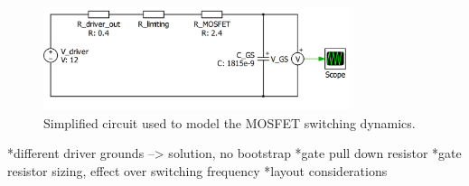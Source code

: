 \begin{figure}[htbp]
	\begin{center}
		\includegraphics[width=0.8\textwidth]{../Pictures/P1/Component_sizing/driver_resistor_sizing.png}
		\caption{Simplified circuit used to model the MOSFET switching dynamics.}
		\label{mosfet_rc_gate}
	\end{center}	
\end{figure}
 

*different driver grounds --> solution, no bootstrap
*gate pull down resistor
*gate resistor sizing, effect over switching frequency 
*layout considerations


